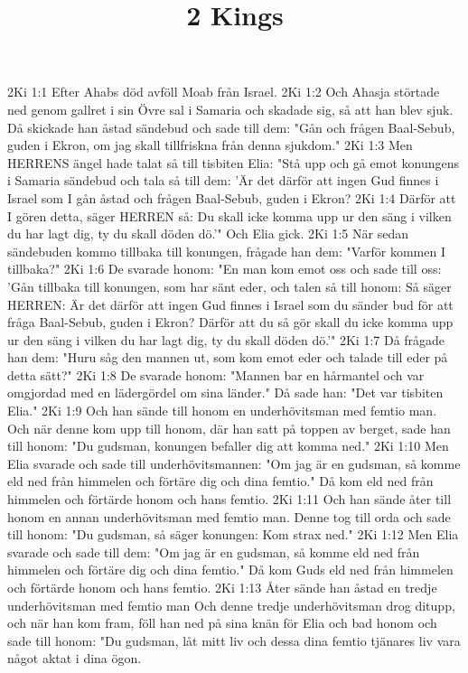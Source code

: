 

\title{2 Kings}

2Ki 1:1  Efter Ahabs död avföll Moab från Israel.
2Ki 1:2  Och Ahasja störtade ned genom gallret i sin Övre sal i Samaria och skadade sig, så att han blev sjuk. Då skickade han åstad sändebud och sade till dem: "Gån och frågen Baal-Sebub, guden i Ekron, om jag skall tillfriskna från denna sjukdom."
2Ki 1:3  Men HERRENS ängel hade talat så till tisbiten Elia: "Stå upp och gå emot konungens i Samaria sändebud och tala så till dem: 'Är det därför att ingen Gud finnes i Israel som I gån åstad och frågen Baal-Sebub, guden i Ekron?
2Ki 1:4  Därför att I gören detta, säger HERREN så: Du skall icke komma upp ur den säng i vilken du har lagt dig, ty du skall döden dö.'" Och Elia gick.
2Ki 1:5  När sedan sändebuden kommo tillbaka till konungen, frågade han dem: "Varför kommen I tillbaka?"
2Ki 1:6  De svarade honom: "En man kom emot oss och sade till oss: 'Gån tillbaka till konungen, som har sänt eder, och talen så till honom: Så säger HERREN: Är det därför att ingen Gud finnes i Israel som du sänder bud för att fråga Baal-Sebub, guden i Ekron? Därför att du så gör skall du icke komma upp ur den säng i vilken du har lagt dig, ty du skall döden dö.'"
2Ki 1:7  Då frågade han dem: "Huru såg den mannen ut, som kom emot eder och talade till eder på detta sätt?"
2Ki 1:8  De svarade honom: "Mannen bar en hårmantel och var omgjordad med en lädergördel om sina länder." Då sade han: "Det var tisbiten Elia."
2Ki 1:9  Och han sände till honom en underhövitsman med femtio man. Och när denne kom upp till honom, där han satt på toppen av berget, sade han till honom: "Du gudsman, konungen befaller dig att komma ned."
2Ki 1:10  Men Elia svarade och sade till underhövitsmannen: "Om jag är en gudsman, så komme eld ned från himmelen och förtäre dig och dina femtio." Då kom eld ned från himmelen och förtärde honom och hans femtio.
2Ki 1:11  Och han sände åter till honom en annan underhövitsman med femtio man. Denne tog till orda och sade till honom: "Du gudsman, så säger konungen: Kom strax ned."
2Ki 1:12  Men Elia svarade och sade till dem: "Om jag är en gudsman, så komme eld ned från himmelen och förtäre dig och dina femtio." Då kom Guds eld ned från himmelen och förtärde honom och hans femtio.
2Ki 1:13  Åter sände han åstad en tredje underhövitsman med femtio man Och denne tredje underhövitsman drog ditupp, och när han kom fram, föll han ned på sina knän för Elia och bad honom och sade till honom: "Du gudsman, låt mitt liv och dessa dina femtio tjänares liv vara något aktat i dina ögon.
